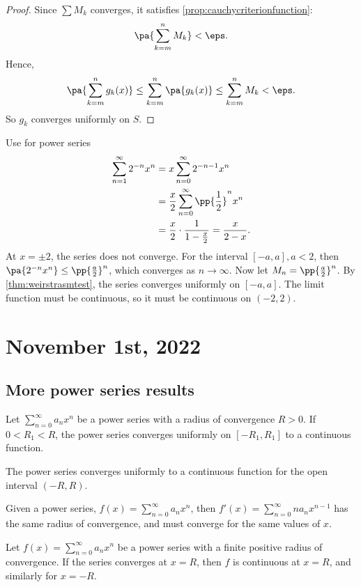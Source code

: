 \documentclass[11pt]{scrartcl}
\numberwithin{equation}{section}
\begin{document}
\begin{proof}
    Since $\sum M_k$ converges, it satisfies \cref{prop:cauchycriterionfunction}:
    \[
        \pa{\sum_{k=m}^{n}M_k}<\eps.
    \]
    Hence, 
    \[
        \pa{\sum_{k=m}^{n}g_k(x)}\leq \sum_{k=m}^{n}\pa{g_k(x)}\leq 
        \sum_{k=m}^{n}M_k<\eps.
    \]
    So $g_k$ converges uniformly on $S$.
\end{proof}

\begin{example}
    Use for power series 
    \begin{align*}
        \sum_{n=1}^{\infty}2^{-n}x^n &= x\sum_{n=0}^{\infty}2^{-n-1}x^n \\
        &= \frac{x}{2}\sum_{n=0}^{\infty}\pp{\frac{1}{2}}^nx^n \\
        &= \frac{x}{2}\cdot\frac{1}{1-\frac{x}{2}}=\frac{x}{2-x}.
    \end{align*}
    At $x=\pm2$, the series does not converge. For the interval
    $[-a,a], a<2$, then $\pa{2^{-n}x^n}\leq \pp{\frac{a}{2}}^n$,
    which converges as $n\to \infty$. Now let $M_n=\pp{\frac{a}{2}}^n$. By 
    \cref{thm:weirstrasmtest}, the series converges uniformly on 
    $[-a,a]$. The limit function must be continuous, so it 
    must be continuous on $(-2,2)$.
\end{example}

\clearpage
\section{November 1st, 2022}
\subsection{More power series results}
\begin{theorem}
    Let $\sum_{n=0}^{\infty}a_nx^n$ be a power series with 
    a radius of convergence $R>0$. If $0<R_1<R$, the power series 
    converges uniformly on $[-R_1,R_1]$ to a continuous function.
\end{theorem}

\begin{corollary}
    The power series converges uniformly to a continuous function for the 
    open interval $(-R,R)$.
\end{corollary}
Given a power series, $f(x) = \sum_{n=0}^{\infty}a_nx^n$, then 
$f'(x) = \sum_{n=0}^{\infty}na_nx^{n-1}$ has the same radius 
of convergence, and must converge for the same values of $x$.

\begin{theorem}
    \label{thm:abelthm}
    Let $f(x)=\sum_{n=0}^{\infty}a_nx^n$ be a power series with a 
    finite positive radius of convergence. If the series 
    converges at $x=R$, then $f$ is continuous at $x=R$,
    and similarly for $x=-R$.
\end{theorem}
\end{document}
